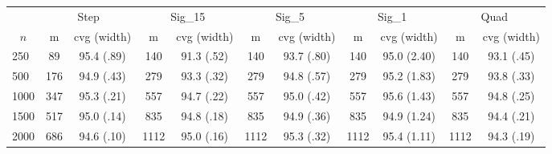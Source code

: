 \begin{tabular}{lcccccccccc}
   \toprule
 
           & \multicolumn{2}{c}{Step}& \multicolumn{2}{c}{Sig\_15}& \multicolumn{2}{c}{Sig\_5}& \multicolumn{2}{c}{Sig\_1}& \multicolumn{2}{c}{Quad} \\ 
             \cmidrule(l{2pt}r{2pt}){2-3} \cmidrule(l{2pt}r{2pt}){4-5} \cmidrule(l{2pt}r{2pt}){6-7} \cmidrule(l{2pt}r{2pt}){8-9}  \cmidrule(l{2pt}r{2pt}){10-11} 
             \multicolumn{1}{c}{$n$} & \multicolumn{1}{c}{m}& \multicolumn{1}{c}{cvg (width)}& \multicolumn{1}{c}{m}& \multicolumn{1}{c}{cvg (width)}& \multicolumn{1}{c}{m}& \multicolumn{1}{c}{cvg (width)}& \multicolumn{1}{c}{m}& \multicolumn{1}{c}{cvg (width)}& \multicolumn{1}{c}{m}& \multicolumn{1}{c}{cvg (width)} \\ \midrule 
        250 & 89 & 95.4 (.89) & 140 & 91.3 (.52) & 140 & 93.7 (.80) & 140 & 95.0 (2.40) & 140 & 93.1 (.45) \\ 
  500 & 176 & 94.9 (.43) & 279 & 93.3 (.32) & 279 & 94.8 (.57) & 279 & 95.2 (1.83) & 279 & 93.8 (.33) \\ 
  1000 & 347 & 95.3 (.21) & 557 & 94.7 (.22) & 557 & 95.0 (.42) & 557 & 95.6 (1.43) & 557 & 94.8 (.25) \\ 
  1500 & 517 & 95.0 (.14) & 835 & 94.8 (.18) & 835 & 94.9 (.36) & 835 & 94.9 (1.24) & 835 & 94.4 (.21) \\ 
  2000 & 686 & 94.6 (.10) & 1112 & 95.0 (.16) & 1112 & 95.3 (.32) & 1112 & 95.4 (1.11) & 1112 & 94.3 (.19) \\ 
   \hline
\end{tabular}
